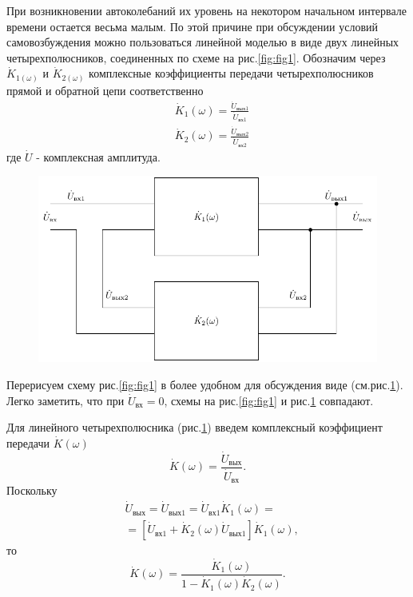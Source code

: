 При возникновении автоколебаний их уровень на некотором начальном интервале времени остается весьма малым. По этой причине при обсуждении условий самовозбуждения можно пользоваться линейной моделью в виде двух линейных четырехполюсников, соединенных по схеме на рис.\ref{fig:fig1}. Обозначим через $\dot{K}_{1(\omega)}$ и $\dot{K}_{2(\omega)}$ комплексные коэффициенты передачи четырехполюсников прямой и обратной цепи соответственно
\begin{equation*}
\begin{aligned}
&\dot{K}_1(\omega)=\frac{\dot{U}_{\text{вых}1}}{\dot{U}_{\text{вх}1}} \\
&\dot{K}_2(\omega)=\frac{\dot{U}_{\text{вых}2}}{\dot{U}_{\text{вх}2}} 
\end{aligned}
\end{equation*}
где $\dot{U}$ - комплексная амплитуда.

\begin{figure}[h]
	\centering
	\includegraphics[width=0.6\linewidth]{circuit/two.pdf}
	\caption{}
	\label{fig:fig3}
\end{figure}

Перерисуем схему рис.\ref{fig:fig1} в более удобном для обсуждения виде (см.рис.\ref{fig:fig3}). Легко заметить, что при $\dot{U}_\text{вх}=0$, схемы на рис.\ref{fig:fig1} и рис.\ref{fig:fig3} совпадают.

Для линейного четырехполюсника (рис.\ref{fig:fig3}) введем комплексный коэффициент передачи $\dot{K}(\omega)$
\begin{equation*}
\dot{K}(\omega)=\frac{\dot{U}_\text{вых}}{\dot{U}_\text{вх}}.
\end{equation*}
Поскольку
\begin{equation*}
\begin{aligned}
&\dot{U}_\text{вых}=\dot{U}_{\text{вых}1}=\dot{U}_{\text{вх}1}\dot{K}_1(\omega)=\\
&= [\dot{U}_{\text{вх}1}+\dot{K}_2(\omega)\dot{U}_{\text{вых}1}]\dot{K}_1(\omega),
\end{aligned}
\end{equation*}
то 
\begin{equation*}
\dot{K}(\omega)=\frac{\dot{K}_1(\omega)}{1-\dot{K}_1(\omega)\dot{K}_2(\omega)}.
\end{equation*}

